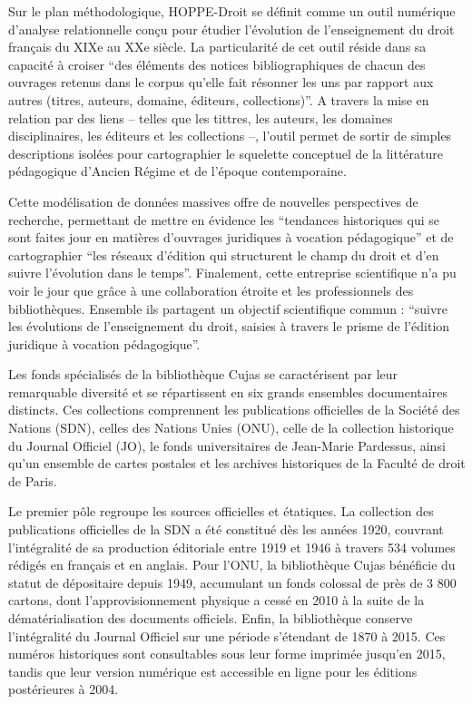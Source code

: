 Sur le plan méthodologique, HOPPE-Droit se définit comme un outil numérique d'analyse relationnelle conçu pour étudier l'évolution de l'enseignement du droit français du XIXe au XXe siècle. La particularité de cet outil réside dans sa capacité à croiser \enquote{des éléments des notices bibliographiques de chacun des ouvrages retenus dans le corpus qu'elle fait résonner les uns par rapport aux autres (titres, auteurs, domaine, éditeurs, collections)}. A travers la mise en relation par des liens -- telles que les tittres, les auteurs, les domaines disciplinaires, les éditeurs et les collections --, l'outil permet de sortir de simples descriptions isolées pour cartographier le squelette conceptuel de la littérature pédagogique d'Ancien Régime et de l'époque contemporaine.

Cette modélisation de données massives offre de nouvelles perspectives de recherche, permettant de mettre en évidence les \enquote{tendances historiques qui se sont faites jour en matières d'ouvrages juridiques à vocation pédagogique} et de cartographier \enquote{les réseaux d'édition qui structurent le champ du droit et d'en suivre l'évolution dans le temps}. Finalement, cette entreprise scientifique n'a pu voir le jour que grâce à une collaboration étroite et les professionnels des bibliothèques. Ensemble ils partagent un objectif scientifique commun : \enquote{suivre les évolutions de l'enseignement du droit, saisies à travers le prisme de l'édition juridique à vocation pédagogique}. 
	
Les fonds spécialisés de la bibliothèque Cujas se caractérisent par leur remarquable diversité et se répartissent en six grands ensembles documentaires distincts. Ces collections comprennent les publications officielles de la Société des Nations (SDN), celles des Nations Unies (ONU), celle de la collection historique du Journal Officiel (JO), le fonds universitaires de Jean-Marie Pardessus, ainsi qu'un ensemble de cartes postales et les archives historiques de la Faculté de droit de Paris. 

Le premier pôle regroupe les sources officielles et étatiques. La collection des publications officielles de la SDN a été constitué dès les années 1920, couvrant l'intégralité de sa production éditoriale entre 1919 et 1946 à travers 534 volumes rédigés en français et en anglais. Pour l'ONU, la bibliothèque Cujas bénéficie du statut de dépositaire depuis 1949, accumulant un fonds colossal de près de 3 800 cartons, dont l'approvisionnement physique a cessé en 2010 à la suite de la dématérialisation des documents officiels. Enfin, la bibliothèque conserve l'intégralité du Journal Officiel sur une période s'étendant de 1870 à 2015. Ces numéros historiques sont consultables sous leur forme imprimée jusqu'en 2015, tandis que leur version numérique est accessible en ligne pour les éditions postérieures à 2004.

